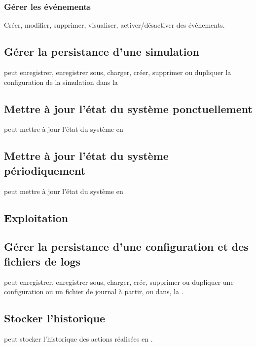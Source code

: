 \subsubsection{Gérer les événements}
Créer, modifier, supprimer, visualiser, activer/désactiver des événements.

\subsection{Gérer la persistance d'une simulation}
 peut enregistrer, enregistrer sous, charger, créer, supprimer ou dupliquer la configuration de la simulation dans la 

\subsection{Mettre à jour l'état du système ponctuellement}
 peut mettre à jour l'état du système en 

\subsection{Mettre à jour l'état du système périodiquement}
 peut mettre à jour l'état du système en 

\subsection{Exploitation}
\subsection{Gérer la persistance d'une configuration et des fichiers de logs}
 peut enregistrer, enregistrer sous, charger, crée, supprimer ou dupliquer une configuration ou un fichier de journal à partir, ou dans, la .

\subsection{Stocker l'historique}
 peut stocker l'historique des actions réalisées en .

